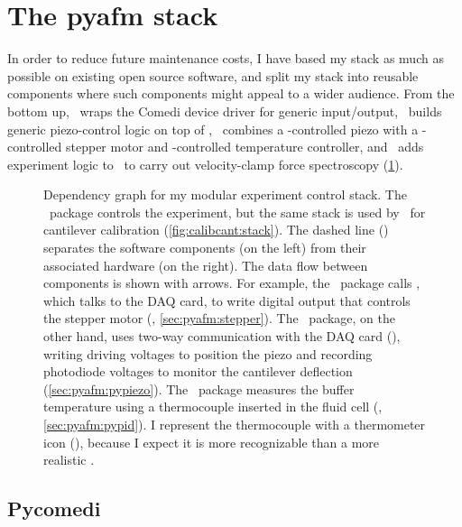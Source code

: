 \section{The pyafm stack}
\label{sec:pyafm:stack}

In order to reduce future maintenance costs, I have based my stack as
much as possible on existing open source software, and split my stack
into reusable components where such components might appeal to a wider
audience.  From the bottom up, \pycomedi\ wraps the Comedi device
driver for generic input/output, \pypiezo\ builds generic
piezo-control logic on top of \pycomedi, \pyafm\ combines a
\pypiezo-controlled piezo with a \stepper-controlled stepper motor and
\pypid-controlled temperature controller, and \unfoldprotein\ adds
experiment logic to \pyafm\ to carry out velocity-clamp force
spectroscopy (\cref{fig:pyafm:stack}).

\begin{figure}
  \caption{Dependency graph for my modular experiment control stack.
    The \unfoldprotein\ package controls the experiment, but the same
    stack is used by \calibcant\ for cantilever calibration
    (\cref{fig:calibcant:stack}).  The dashed line
    () separates the software components (on
    the left) from their associated hardware (on the right).  The data
    flow between components is shown with arrows.  For example, the
    \stepper\ package calls \pycomedi, which talks to the DAQ card, to
    write digital output that controls the stepper motor
    (, \cref{sec:pyafm:stepper}).  The
    \pypiezo\ package, on the other hand, uses two-way communication
    with the DAQ card (), writing driving voltages
    to position the piezo and recording photodiode voltages to monitor
    the cantilever deflection (\cref{sec:pyafm:pypiezo}).  The
    \pypid\ package measures the buffer temperature using a
    thermocouple inserted in the fluid cell (,
    \cref{sec:pyafm:pypid}).  I represent the thermocouple with a
    thermometer icon (\thermometer), because I expect it is more
    recognizable than a more realistic
    \thermocouple.\label{fig:pyafm:stack}}
\end{figure}

\subsection{Pycomedi}
\label{sec:pyafm:pycomedi}

